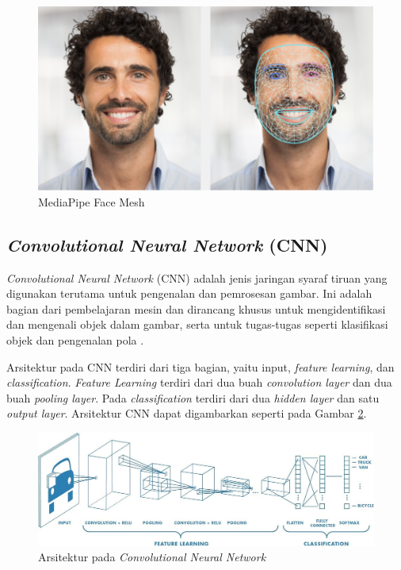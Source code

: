 \begin{figure} [ht] \centering
    \includegraphics[scale=0.3]{gambar/face_landmark.png}
    \caption{MediaPipe Face Mesh}
    \label{fig:facemesh}
\end{figure}

\subsection{\emph{Convolutional Neural Network} (CNN)}

\emph{Convolutional Neural Network} (CNN) adalah jenis jaringan syaraf tiruan yang digunakan terutama untuk pengenalan dan pemrosesan gambar. Ini adalah bagian dari pembelajaran mesin dan dirancang khusus untuk mengidentifikasi dan mengenali objek dalam gambar, serta untuk tugas-tugas seperti klasifikasi objek dan pengenalan pola \cite{arm_2023}. 

Arsitektur pada CNN terdiri dari tiga bagian, yaitu input, \emph{feature learning}, dan \emph{classification}. \emph{Feature Learning} terdiri dari dua buah \emph{convolution layer} dan dua buah \emph{pooling layer}. Pada \emph{classification} terdiri dari dua \emph{hidden layer} dan satu \emph{output layer}. Arsitektur CNN dapat digambarkan seperti pada Gambar \ref{fig:arsitektur cnn}.

\begin{figure} [ht] \centering
    \includegraphics[scale=0.2]{gambar/cnn.jpg}
    \caption{Arsitektur pada \emph{Convolutional Neural Network}}
    \label{fig:arsitektur cnn}
\end{figure}

